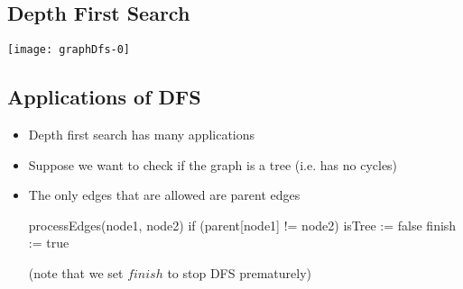 
\begin{slide}
\section[-2]{Depth First Search}
\pb
\pause
\begin{center}
  \texttt{[image: graphDfs-0]}
  {}
\end{center}

\end{slide}


\begin{slide}
\section{Applications of DFS}

\begin{PauseHighLight}
  \begin{itemize}
  \item Depth first search has many applications\pause
  \item Suppose we want to check if the graph is a tree (i.e. has no cycles)\pause
  \item The only edges that are allowed are parent edges
    \begin{pseudo}
      processEdges(node1, node2) {
         if (parent[node1] != node2) {
            isTree := false
            finish := true
         }
      }
    \end{pseudo}
    (note that we set \jl$finish$ to stop DFS prematurely)\pause
  \end{itemize}
\end{PauseHighLight}

\end{slide}


